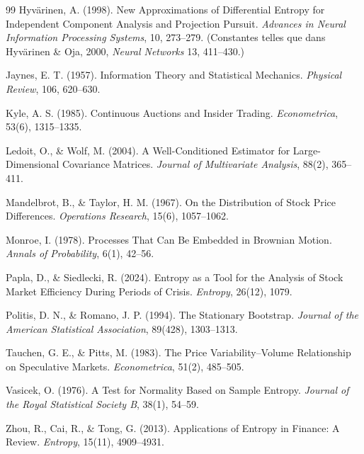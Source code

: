 \documentclass[11pt]{article}
\theoremstyle{definition}
\theoremstyle{remark}
\begin{document}
\begin{thebibliography}{99}
 Hyvärinen, A. (1998). New Approximations of Differential Entropy for Independent Component Analysis and Projection Pursuit. \textit{Advances in Neural Information Processing Systems}, 10, 273--279. (Constantes telles que dans Hyvärinen \& Oja, 2000, \textit{Neural Networks} 13, 411--430.)

 Jaynes, E. T. (1957). Information Theory and Statistical Mechanics. \textit{Physical Review}, 106, 620--630.

 Kyle, A. S. (1985). Continuous Auctions and Insider Trading. \textit{Econometrica}, 53(6), 1315--1335.

 Ledoit, O., \& Wolf, M. (2004). A Well-Conditioned Estimator for Large-Dimensional Covariance Matrices. \textit{Journal of Multivariate Analysis}, 88(2), 365--411.

 Mandelbrot, B., \& Taylor, H. M. (1967). On the Distribution of Stock Price Differences. \textit{Operations Research}, 15(6), 1057--1062.

 Monroe, I. (1978). Processes That Can Be Embedded in Brownian Motion. \textit{Annals of Probability}, 6(1), 42--56.

 Papla, D., \& Siedlecki, R. (2024). Entropy as a Tool for the Analysis of Stock Market Efficiency During Periods of Crisis. \textit{Entropy}, 26(12), 1079.

 Politis, D. N., \& Romano, J. P. (1994). The Stationary Bootstrap. \textit{Journal of the American Statistical Association}, 89(428), 1303--1313.

 Tauchen, G. E., \& Pitts, M. (1983). The Price Variability--Volume Relationship on Speculative Markets. \textit{Econometrica}, 51(2), 485--505.

 Vasicek, O. (1976). A Test for Normality Based on Sample Entropy. \textit{Journal of the Royal Statistical Society B}, 38(1), 54--59.

 Zhou, R., Cai, R., \& Tong, G. (2013). Applications of Entropy in Finance: A Review. \textit{Entropy}, 15(11), 4909--4931.

\end{thebibliography}
\end{document}
